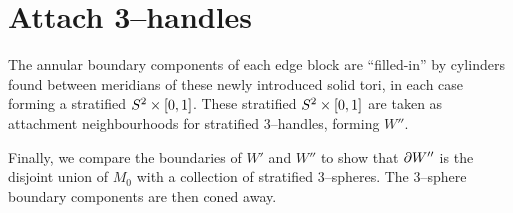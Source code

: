 \section{Attach 3--handles}

The annular boundary components of each edge block are ``filled-in'' by cylinders found between meridians of these newly introduced solid tori, in each case forming a stratified $S^2\times[0,1]$.
These stratified $S^2\times[0,1]$ are taken as attachment neighbourhoods for stratified 3--handles, forming $W''$.

Finally, we compare the boundaries of $W'$ and $W''$ to show that $\partial W''$ is the disjoint union of  $M_0$ with a collection of stratified 3--spheres.
The 3--sphere boundary components are then coned away.
